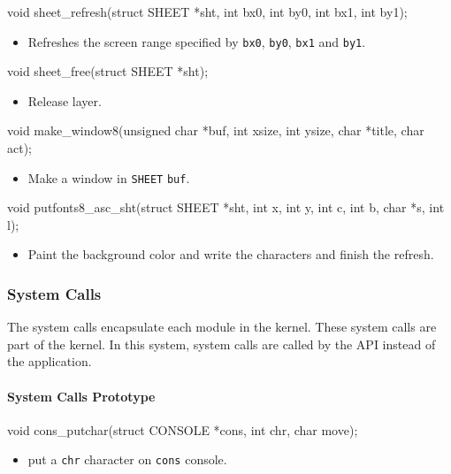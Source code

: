 \documentclass{swfcthesis}
\begin{document}
\begin{ccode}
void sheet_refresh(struct SHEET *sht, int bx0, int by0, int bx1, int by1);
\end{ccode}
\begin{itemize}
\item Refreshes the screen range specified by \texttt{bx0}, \texttt{by0}, \texttt{bx1} and
  \texttt{by1}.
\end{itemize}

\begin{ccode}
void sheet_free(struct SHEET *sht);
\end{ccode}
\begin{itemize}
\item Release layer.
\end{itemize}

\begin{ccode}
void make_window8(unsigned char *buf, int xsize, int ysize, char *title, char act);
\end{ccode}
\begin{itemize}
\item Make a window in \texttt{SHEET} \texttt{buf}.
\end{itemize}

\begin{ccode}
void putfonts8_asc_sht(struct SHEET *sht, int x, int y, int c, int b, char *s, int l);
\end{ccode}
\begin{itemize}
\item Paint the background color and write the characters and finish the refresh.
\end{itemize}

\subsubsection{System Calls}
\label{sec:system-call}

The system calls encapsulate each module in the kernel. These system calls are part of the
kernel. In this system, system calls are called by the API instead of the
application.

\paragraph{System Calls Prototype}

\begin{ccode}
void cons_putchar(struct CONSOLE *cons, int chr, char move);
\end{ccode}
\begin{itemize}
\item put a \texttt{chr} character on \texttt{cons} console.
\end{itemize}
\end{document}
